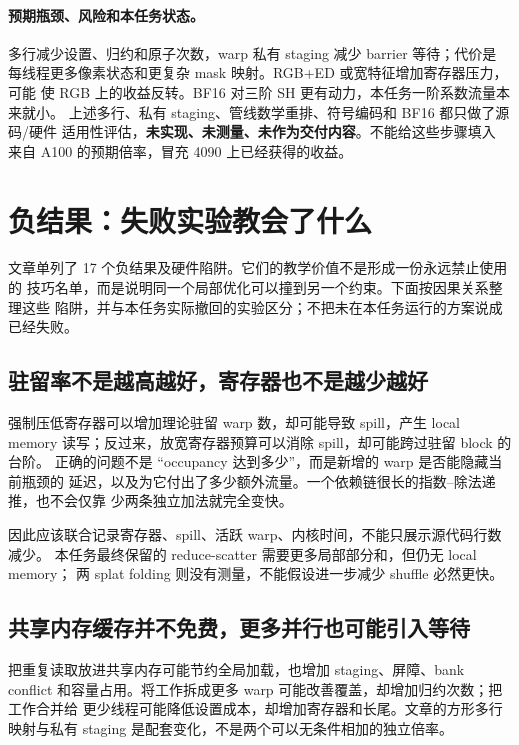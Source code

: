\paragraph{预期瓶颈、风险和本任务状态。}
多行减少设置、归约和原子次数，warp 私有 staging 减少 barrier 等待；代价是
每线程更多像素状态和更复杂 mask 映射。RGB+ED 或宽特征增加寄存器压力，可能
使 RGB 上的收益反转。BF16 对三阶 SH 更有动力，本任务一阶系数流量本来就小。
上述多行、私有 staging、管线数学重排、符号编码和 BF16 都只做了源码/硬件
适用性评估，\textbf{未实现、未测量、未作为交付内容}。不能给这些步骤填入
来自 A100 的预期倍率，冒充 4090 上已经获得的收益。

\section{负结果：失败实验教会了什么}

文章单列了 17 个负结果及硬件陷阱。它们的教学价值不是形成一份永远禁止使用的
技巧名单，而是说明同一个局部优化可以撞到另一个约束。下面按因果关系整理这些
陷阱，并与本任务实际撤回的实验区分；不把未在本任务运行的方案说成已经失败。

\subsection{驻留率不是越高越好，寄存器也不是越少越好}

强制压低寄存器可以增加理论驻留 warp 数，却可能导致 spill，产生 local memory
读写；反过来，放宽寄存器预算可以消除 spill，却可能跨过驻留 block 的台阶。
正确的问题不是 ``occupancy 达到多少''，而是新增的 warp 是否能隐藏当前瓶颈的
延迟，以及为它付出了多少额外流量。一个依赖链很长的指数--除法递推，也不会仅靠
少两条独立加法就完全变快。

因此应该联合记录寄存器、spill、活跃 warp、内核时间，不能只展示源代码行数减少。
本任务最终保留的 reduce-scatter 需要更多局部部分和，但仍无 local memory；
两 splat folding 则没有测量，不能假设进一步减少 shuffle 必然更快。

\subsection{共享内存缓存并不免费，更多并行也可能引入等待}

把重复读取放进共享内存可能节约全局加载，也增加 staging、屏障、bank conflict
和容量占用。将工作拆成更多 warp 可能改善覆盖，却增加归约次数；把工作合并给
更少线程可能降低设置成本，却增加寄存器和长尾。文章的方形多行映射与私有 staging
是配套变化，不是两个可以无条件相加的独立倍率。

